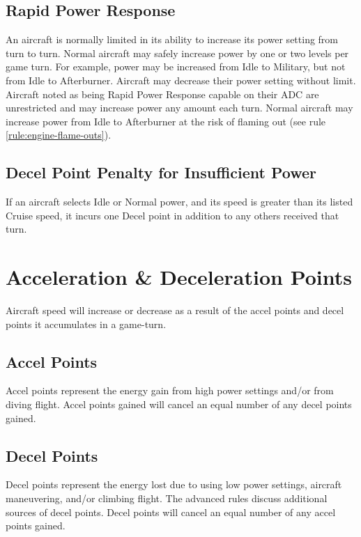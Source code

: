 \subsection{Rapid Power Response} An aircraft is normally limited in its ability to increase its power setting from turn to turn. Normal aircraft may safely increase power by one or two levels per game turn. For example, power may be increased from Idle to Military, but not from Idle to Afterburner. Aircraft may decrease their power setting without limit. Aircraft noted as being Rapid Power Response capable on their ADC are unrestricted and may increase power any amount each turn. Normal aircraft may increase power from Idle to Afterburner at the risk of flaming out (see rule \ref{rule:engine-flame-outs}).

\subsection{Decel Point Penalty for Insufficient Power} If an aircraft selects Idle or Normal power, and its speed is greater than its listed Cruise speed, it incurs one Decel point in addition to any others received that turn.

\section{Acceleration \& Deceleration Points}
\label{rule:acceleration-and-deceleration-points}
\label{rule:speed-change}

Aircraft speed will increase or decrease as a result of the accel points and decel points it accumulates in a game-turn. 

\subsection{Accel Points} Accel points represent the energy gain from high power settings and/or from diving flight. Accel points gained will cancel an equal number of any decel points gained.

\subsection{Decel Points} Decel points represent the energy lost due to using low power settings, aircraft maneuvering, and/or climbing flight. The advanced rules discuss additional sources of decel points. Decel points will cancel an equal number of any accel points gained.

